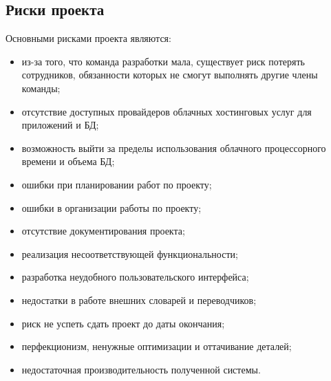 \documentclass[a4paper,14pt]{extarticle}
\begin{document}
\subsection{Риски проекта}
Основными рисками проекта являются:
\begin{itemize}
    \item из-за того, что команда разработки мала, существует риск потерять
          сотрудников, обязанности которых не смогут выполнять другие члены команды;
    \item отсутствие доступных провайдеров облачных хостинговых услуг для приложений и БД;
    \item возможность выйти за пределы использования облачного процессорного времени и объема БД; 
    \item ошибки при планировании работ по проекту;
    \item ошибки в организации работы по проекту;
    \item отсутствие документирования проекта;
    \item реализация несоответствующей функциональности;
    \item разработка неудобного пользовательского интерфейса;
    \item недостатки в работе внешних словарей и переводчиков;
    \item риск не успеть сдать проект до даты окончания;
    \item перфекционизм, ненужные оптимизации и оттачивание деталей;
    \item недостаточная производительность полученной системы.
\end{itemize}
\end{document}
